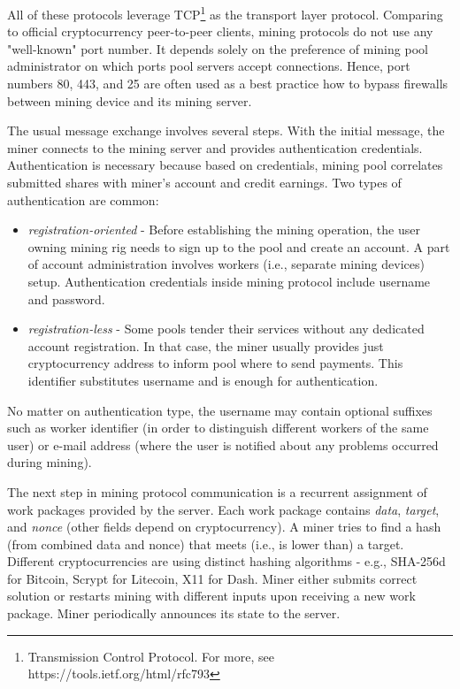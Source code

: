 \documentclass[preprint,12pt,3p]{elsarticle}
\begin{document}
All of these protocols leverage TCP\footnote{Transmission Control Protocol. For more, see https://tools.ietf.org/html/rfc793} as the transport layer protocol. Comparing to official cryptocurrency peer-to-peer clients, mining protocols do not use any "well-known" port number. It depends solely on the preference of mining pool administrator on which ports pool servers accept connections. Hence, port numbers 80, 443, and 25 are often used as a best practice how to bypass firewalls between mining device and its mining server. 

The usual message exchange involves several steps. With the initial message, the miner connects to the mining server and provides authentication credentials. Authentication is necessary because based on credentials, mining pool correlates submitted shares with miner's account and credit earnings. Two types of authentication are common: 

\begin{itemize}
    \item \textit{registration-oriented} - Before establishing the mining operation, the user owning mining rig needs to sign up to the pool and create an account. A part of account administration involves workers (i.e., separate mining devices) setup. Authentication credentials inside mining protocol include username and password.
    \item \textit{registration-less} - Some pools tender their services without any dedicated account registration. In that case, the miner usually provides just cryptocurrency address to inform pool where to send payments. This identifier substitutes username and is enough for authentication. 
\end{itemize}

No matter on authentication type, the username may contain optional suffixes such as worker identifier (in order to distinguish different workers of the same user) or e-mail address (where the user is notified about any problems occurred during mining).

The next step in mining protocol communication is a recurrent assignment of work packages provided by the server. Each work package contains \textit{data}, \textit{target}, and \textit{nonce} (other fields depend on cryptocurrency). A miner tries to find a hash (from combined data and nonce) that meets (i.e., is lower than) a target. Different cryptocurrencies are using distinct hashing algorithms - e.g., SHA-256d for Bitcoin, Scrypt for Litecoin, X11 for Dash. Miner either submits correct solution or restarts mining with different inputs upon receiving a new work package. Miner periodically announces its state to the server.
\end{document}
